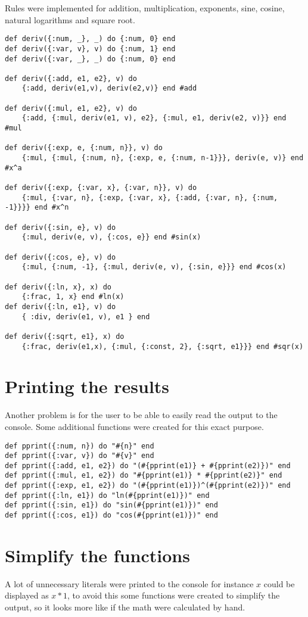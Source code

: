 Rules were implemented for addition, multiplication, exponents, sine, cosine, natural logarithms and square root.

\begin{verbatim}
def deriv({:num, _}, _) do {:num, 0} end
def deriv({:var, v}, v) do {:num, 1} end
def deriv({:var, _}, _) do {:num, 0} end

def deriv({:add, e1, e2}, v) do 
    {:add, deriv(e1,v), deriv(e2,v)} end #add

def deriv({:mul, e1, e2}, v) do 
    {:add, {:mul, deriv(e1, v), e2}, {:mul, e1, deriv(e2, v)}} end #mul

def deriv({:exp, e, {:num, n}}, v) do 
    {:mul, {:mul, {:num, n}, {:exp, e, {:num, n-1}}}, deriv(e, v)} end #x^a
    
def deriv({:exp, {:var, x}, {:var, n}}, v) do
    {:mul, {:var, n}, {:exp, {:var, x}, {:add, {:var, n}, {:num, -1}}}} end #x^n

def deriv({:sin, e}, v) do 
    {:mul, deriv(e, v), {:cos, e}} end #sin(x)

def deriv({:cos, e}, v) do
    {:mul, {:num, -1}, {:mul, deriv(e, v), {:sin, e}}} end #cos(x)

def deriv({:ln, x}, x) do
    {:frac, 1, x} end #ln(x)
def deriv({:ln, e1}, v) do
    { :div, deriv(e1, v), e1 } end

def deriv({:sqrt, e1}, x) do
    {:frac, deriv(e1,x), {:mul, {:const, 2}, {:sqrt, e1}}} end #sqr(x)
\end{verbatim}

\section{Printing the results}
Another problem is for the user to be able to easily read the output to the console. Some additional functions were created for this exact purpose.

\begin{verbatim}
def pprint({:num, n}) do "#{n}" end
def pprint({:var, v}) do "#{v}" end
def pprint({:add, e1, e2}) do "(#{pprint(e1)} + #{pprint(e2)})" end
def pprint({:mul, e1, e2}) do "#{pprint(e1)} * #{pprint(e2)}" end
def pprint({:exp, e1, e2}) do "(#{pprint(e1)})^(#{pprint(e2)})" end
def pprint({:ln, e1}) do "ln(#{pprint(e1)})" end
def pprint({:sin, e1}) do "sin(#{pprint(e1)})" end
def pprint({:cos, e1}) do "cos(#{pprint(e1)})" end
\end{verbatim}

\section{Simplify the functions}
A lot of unnecessary literals were printed to the console for instance $x$ could be displayed as $x * 1 $, to avoid this some functions were created to simplify the output, so it looks more like if the math were calculated by hand.

